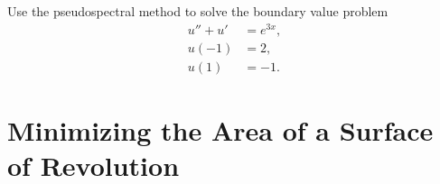 \begin{problem}
Use the pseudospectral method to solve the boundary value problem 
\begin{align*}
u'' + u' &= e^{3x}, \\
u(-1) &= 2, \\
u(1) &= -1.
\end{align*}
	
\end{problem}





\section*{Minimizing the Area of a Surface of Revolution}












